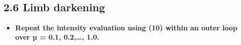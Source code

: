 \documentclass{article}
\providecommand{\tightlist}{%
      \setlength{\itemsep}{0pt}\setlength{\parskip}{0pt}}
\begin{document}
    \begin{center}
    \end{center}
    { \hspace*{\fill} \\}
    
    \subsection*{2.6 Limb darkening}\label{limb-darkening}

\begin{itemize}
\tightlist
\item
  \textbf{Repeat the intensity evaluation using (10) within an outer
  loop over µ = 0.1, 0.2,\ldots{}, 1.0.}
\end{itemize}
\end{document}
